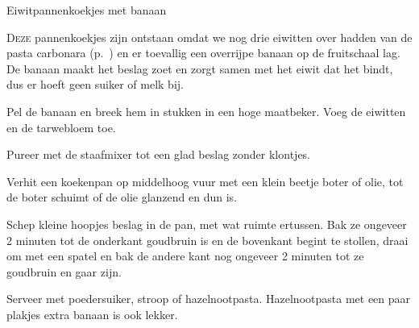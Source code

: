 \begin{recipe}{Eiwitpannenkoekjes met banaan}
\label{recipe:eiwitpannenkoekjes-banaan}


\lettrine{D}{eze} pannenkoekjes zijn ontstaan omdat we nog drie eiwitten over
hadden van de pasta carbonara (p.~\pageref{recipe:pasta-carbonara}) en er
toevallig een overrijpe banaan op de fruitschaal lag. De banaan maakt het beslag
zoet en zorgt samen met het eiwit dat het bindt, dus er hoeft geen suiker of melk
bij.

\begin{ingredients}
\end{ingredients}

\begin{steps}
  \item Pel de banaan en breek hem in stukken in een hoge maatbeker. Voeg de
        eiwitten en de tarwebloem toe.
  \item Pureer met de staafmixer tot een glad beslag zonder klontjes.
  \item Verhit een koekenpan op middelhoog vuur met een klein beetje boter of
        olie, tot de boter schuimt of de olie glanzend en dun is.
  \item Schep kleine hoopjes beslag in de pan, met wat ruimte ertussen. Bak ze
        ongeveer 2 minuten tot de onderkant goudbruin is en de bovenkant begint
        te stollen, draai om met een spatel en bak de andere kant nog ongeveer
        2 minuten tot ze goudbruin en gaar zijn.
  \item Serveer met poedersuiker, stroop of hazelnootpasta. Hazelnootpasta met
        een paar plakjes extra banaan is ook lekker.
\end{steps}
\end{recipe}
